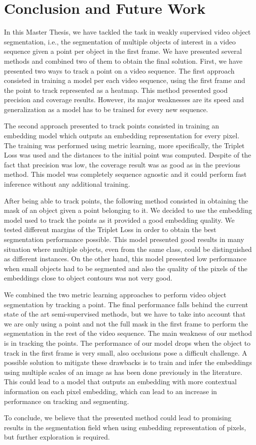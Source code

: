
\chapter{Conclusion and Future Work}
\label{cha:conclusionsfuturework}

In this Master Thesis, we have tackled the task in weakly supervised video object segmentation, i.e., 
the segmentation of multiple objects of interest in a video sequence given a point per object in the first frame.
We have presented several methods and combined two of them to obtain the final solution.
First, we have presented two ways to track a point on a video sequence.
The first approach consisted in training a model per each video sequence, 
using the first frame and the point to track represented as a heatmap.
This method presented good precision and coverage results. 
However, its major weaknesses are its speed and generalization as a model has to be trained for every new sequence.

The second approach presented to track points consisted in training an embedding model which outputs an embedding representation for every pixel.
The training was performed using metric learning, more specifically, the Triplet Loss was used and the distances to the initial point was computed.
Despite of the fact that precision was low, the coverage result was as good as in the previous method.
This model was completely sequence agnostic and it could perform fast inference without any additional training.

After being able to track points, the following method consisted in obtaining the mask of an object given a point belonging to it.
We decided to use the embedding model used to track the points as it provided a good embedding quality.
We tested different margins of the Triplet Loss in order to obtain the best segmentation performance possible.
This model presented good results in many situation where multiple objects, even from the same class, 
could be distinguished as different instances.
On the other hand, 
this model presented low performance when small objects had to be segmented and also the quality of the pixels of the embeddings close to object contours was not very good.

We combined the two metric learning approaches to perform video object segmentation by tracking a point. The final performance falls behind the current state of the art semi-supervised methods, but we have to take into account that we are only using a point and not the full mask in the first frame to perform the segmentation in the rest of the video sequence.
The main weakness of our method is in tracking the points. The performance of our model drops when the object to track in the first frame is very small, also occlusions pose a difficult challenge.
A possible solution to mitigate these drawbacks is to train and infer the embeddings using multiple scales of an image as has been done previously in the literature.
This could lead to a model that outputs an embedding with more contextual information on each pixel embedding, which can lead to an increase in performance on tracking and segmenting.

To conclude, we believe that the presented method could lead to promising results in the segmentation field when using embedding representation of pixels, but further exploration is required. 
